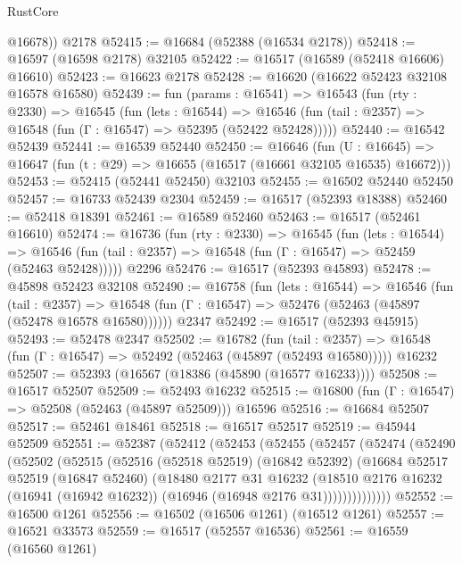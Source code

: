 \begin{lexlean}{RustCore}
\begin{coremodule}
        @16678))
    @2178
@52415 := @16684 (@52388 (@16534 @2178))
@52418 := @16597 (@16598 @2178) @32105
@52422 := @16517 (@16589 (@52418 @16606) @16610)
@52423 := @16623 @2178
@52428 := @16620 (@16622 @52423 @32108 @16578 @16580)
@52439 := fun (params : @16541) =>
  @16543
    (fun (rty : @2330) =>
    @16545
      (fun (lets : @16544) =>
      @16546 (fun (tail : @2357) => @16548 (fun (Γ : @16547) => @52395 (@52422 @52428)))))
@52440 := @16542 @52439
@52441 := @16539 @52440
@52450 := @16646
    (fun (U : @16645) => @16647 (fun (t : @29) => @16655 (@16517 (@16661 @32105 @16535) @16672)))
@52453 := @52415 (@52441 @52450) @32103
@52455 := @16502 @52440 @52450
@52457 := @16733 @52439 @2304
@52459 := @16517 (@52393 @18388)
@52460 := @52418 @18391
@52461 := @16589 @52460
@52463 := @16517 (@52461 @16610)
@52474 := @16736
    (fun (rty : @2330) =>
    @16545
      (fun (lets : @16544) =>
      @16546 (fun (tail : @2357) => @16548 (fun (Γ : @16547) => @52459 (@52463 @52428)))))
    @2296
@52476 := @16517 (@52393 @45893)
@52478 := @45898 @52423 @32108
@52490 := @16758
    (fun (lets : @16544) =>
    @16546
      (fun (tail : @2357) =>
      @16548 (fun (Γ : @16547) => @52476 (@52463 (@45897 (@52478 @16578 @16580))))))
    @2347
@52492 := @16517 (@52393 @45915)
@52493 := @52478 @2347
@52502 := @16782
    (fun (tail : @2357) => @16548 (fun (Γ : @16547) => @52492 (@52463 (@45897 (@52493 @16580)))))
    @16232
@52507 := @52393 (@16567 (@18386 (@45890 (@16577 @16233))))
@52508 := @16517 @52507
@52509 := @52493 @16232
@52515 := @16800 (fun (Γ : @16547) => @52508 (@52463 (@45897 @52509))) @16596
@52516 := @16684 @52507
@52517 := @52461 @18461
@52518 := @16517 @52517
@52519 := @45944 @52509
@52551 := @52387
    (@52412
      (@52453
        (@52455
          (@52457
            (@52474
              (@52490
                (@52502
                  (@52515
                    (@52516
                      (@52518 @52519)
                      (@16842 @52392)
                      (@16684
                        @52517
                        @52519
                        (@16847 @52460)
                        (@18480
                          @2177
                          @31
                          @16232
                          (@18510
                            @2176
                            @16232
                            (@16941 (@16942 @16232))
                            (@16946 (@16948 @2176 @31))))))))))))))
@52552 := @16500 @1261
@52556 := @16502 (@16506 @1261) (@16512 @1261)
@52557 := @16521 @33573
@52559 := @16517 (@52557 @16536)
@52561 := @16559 (@16560 @1261)

\end{coremodule}
\end{lexlean}
